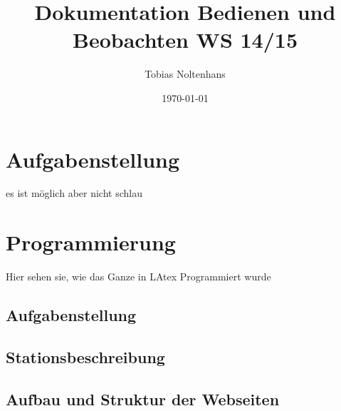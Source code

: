 \documentclass[12pt,a4paper]{book}
\author{Tobias Noltenhans}
\title{Dokumentation Bedienen und Beobachten WS 14/15}
\date{\today}
\begin{document}
\maketitle
\tableofcontents
\chapter{Aufgabenstellung}
es ist möglich aber nicht schlau
\chapter{Programmierung}
Hier sehen sie, wie das Ganze in LAtex Programmiert wurde
\section{Aufgabenstellung}
\section{Stationsbeschreibung}
\section{Aufbau und Struktur der Webseiten}
\end{document}
